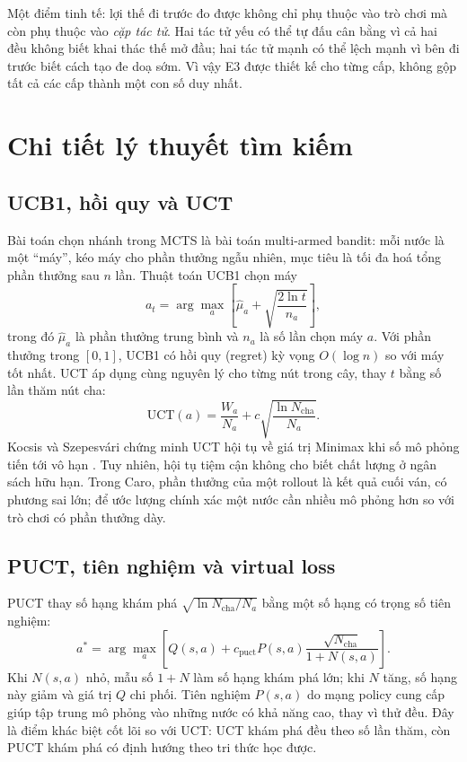 Một điểm tinh tế: lợi thế đi trước đo được không chỉ phụ thuộc vào trò chơi mà còn phụ thuộc
vào \emph{cặp tác tử}. Hai tác tử yếu có thể tự đấu cân bằng vì cả hai đều không biết khai thác
thế mở đầu; hai tác tử mạnh có thể lệch mạnh vì bên đi trước biết cách tạo đe doạ sớm. Vì vậy
E3 được thiết kế cho từng cấp, không gộp tất cả các cấp thành một con số duy nhất.

\section{Chi tiết lý thuyết tìm kiếm}
\label{sec:lt-tim-kiem}
\subsection{UCB1, hồi quy và UCT}
\label{sec:lt-ucb}
Bài toán chọn nhánh trong MCTS là bài toán multi-armed bandit: mỗi nước là một ``máy'', kéo
máy cho phần thưởng ngẫu nhiên, mục tiêu là tối đa hoá tổng phần thưởng sau $n$ lần. Thuật
toán UCB1 \cite{auer2002ucb} chọn máy
\begin{equation}
  a_t = \arg\max_a \left[ \hat\mu_a + \sqrt{\frac{2\ln t}{n_a}} \right],
  \label{eq:ucb1}
\end{equation}
trong đó $\hat\mu_a$ là phần thưởng trung bình và $n_a$ là số lần chọn máy $a$. Với phần thưởng
trong $[0,1]$, UCB1 có hồi quy (regret) kỳ vọng $O(\log n)$ so với máy tốt nhất. UCT áp dụng
cùng nguyên lý cho từng nút trong cây, thay $t$ bằng số lần thăm nút cha:
\begin{equation}
  \mathrm{UCT}(a) = \frac{W_a}{N_a} + c\sqrt{\frac{\ln N_{\text{cha}}}{N_a}}.
  \label{eq:uct2}
\end{equation}
Kocsis và Szepesvári chứng minh UCT hội tụ về giá trị Minimax khi số mô phỏng tiến tới vô hạn
\cite{kocsis2006uct}. Tuy nhiên, hội tụ tiệm cận không cho biết chất lượng ở ngân sách hữu hạn.
Trong Caro, phần thưởng của một rollout là kết quả cuối ván, có phương sai lớn; để ước lượng
chính xác một nước cần nhiều mô phỏng hơn so với trò chơi có phần thưởng dày.

\subsection{PUCT, tiên nghiệm và virtual loss}
\label{sec:lt-puct}
PUCT thay số hạng khám phá $\sqrt{\ln N_{\text{cha}}/N_a}$ bằng một số hạng có trọng số tiên
nghiệm:
\begin{equation}
  a^* = \arg\max_a \left[ Q(s,a) + c_{\text{puct}} P(s,a) \frac{\sqrt{N_{\text{cha}}}}{1+N(s,a)} \right].
  \label{eq:puct2}
\end{equation}
Khi $N(s,a)$ nhỏ, mẫu số $1+N$ làm số hạng khám phá lớn; khi $N$ tăng, số hạng này giảm và giá
trị $Q$ chi phối. Tiên nghiệm $P(s,a)$ do mạng policy cung cấp giúp tập trung mô phỏng vào những
nước có khả năng cao, thay vì thử đều. Đây là điểm khác biệt cốt lõi so với UCT: UCT khám phá
đều theo số lần thăm, còn PUCT khám phá có định hướng theo tri thức học được.

